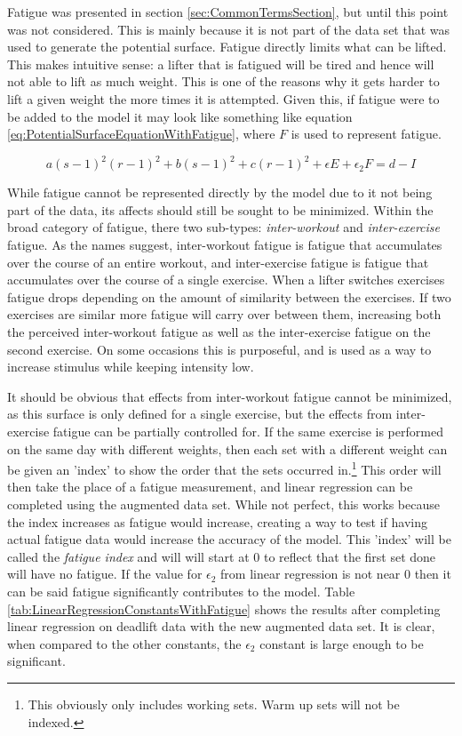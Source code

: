 Fatigue was presented in section \ref{sec:CommonTermsSection}, but until this point was not considered. This is mainly because it is not part of the data set that was used to generate the potential surface. Fatigue directly limits what can be lifted. This makes intuitive sense: a lifter that is fatigued will be tired and hence will not able to lift as much weight. This is one of the reasons why it gets harder to lift a given weight the more times it is attempted. Given this, if fatigue were to be added to the model it may look like something like equation \ref{eq:PotentialSurfaceEquationWithFatigue}, where $F$ is used to represent fatigue.

\begin{equation}
    \label{eq:PotentialSurfaceEquationWithFatigue}
    a(s-1)^2(r-1)^2+b(s-1)^2+c(r-1)^2+\epsilon E+\epsilon_2 F=d-I
\end{equation}

While fatigue cannot be represented directly by the model due to it not being part of the data, its affects should still be sought to be minimized. Within the broad category of fatigue, there two sub-types: \textit{inter-workout} and \textit{inter-exercise} fatigue. As the names suggest, inter-workout fatigue is fatigue that accumulates over the course of an entire workout, and inter-exercise fatigue is fatigue that accumulates over the course of a single exercise. When a lifter switches exercises fatigue drops depending on the amount of similarity between the exercises. If two exercises are similar more fatigue will carry over between them, increasing both the perceived inter-workout fatigue as well as the inter-exercise fatigue on the second exercise. On some occasions this is purposeful, and is used as a way to increase stimulus while keeping intensity low.

It should be obvious that effects from inter-workout fatigue cannot be minimized, as this surface is only defined for a single exercise, but the effects from inter-exercise fatigue can be partially controlled for. If the same exercise is performed on the same day with different weights, then each set with a different weight can be given an 'index' to show the order that the sets occurred in.\footnote{This obviously only includes working sets. Warm up sets will not be indexed.} This order will then take the place of a fatigue measurement, and linear regression can be completed using the augmented data set. While not perfect, this works because the index increases as fatigue would increase, creating a way to test if having actual fatigue data would increase the accuracy of the model. This 'index' will be called the \textit{fatigue index} and will will start at $0$ to reflect that the first set done will have no fatigue. If the value for $\epsilon_2$ from linear regression is not near $0$ then it can be said fatigue significantly contributes to the model. Table \ref{tab:LinearRegressionConstantsWithFatigue} shows the results after completing linear regression on deadlift data with the new augmented data set. It is clear, when compared to the other constants, the $\epsilon_2$ constant is large enough to be significant.

